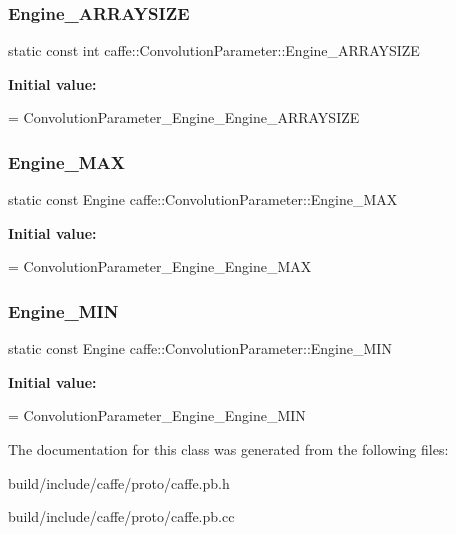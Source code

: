 \subsubsection{\texorpdfstring{Engine\+\_\+\+A\+R\+R\+A\+Y\+S\+I\+ZE}{Engine\_ARRAYSIZE}}
{\footnotesize\ttfamily static const int caffe\+::\+Convolution\+Parameter\+::\+Engine\+\_\+\+A\+R\+R\+A\+Y\+S\+I\+ZE\hspace{0.3cm}{\ttfamily [static]}}

{\bfseries Initial value\+:}
\begin{DoxyCode}
=
    ConvolutionParameter\_Engine\_Engine\_ARRAYSIZE
\end{DoxyCode}
\mbox{\label{classcaffe_1_1_convolution_parameter_a91a3593b974785391a6ae8df04d4f12b}} 
\subsubsection{\texorpdfstring{Engine\+\_\+\+M\+AX}{Engine\_MAX}}
{\footnotesize\ttfamily static const Engine caffe\+::\+Convolution\+Parameter\+::\+Engine\+\_\+\+M\+AX\hspace{0.3cm}{\ttfamily [static]}}

{\bfseries Initial value\+:}
\begin{DoxyCode}
=
    ConvolutionParameter\_Engine\_Engine\_MAX
\end{DoxyCode}
\mbox{\label{classcaffe_1_1_convolution_parameter_a89bb6e2be40de14666a1d648a4fa498e}} 
\subsubsection{\texorpdfstring{Engine\+\_\+\+M\+IN}{Engine\_MIN}}
{\footnotesize\ttfamily static const Engine caffe\+::\+Convolution\+Parameter\+::\+Engine\+\_\+\+M\+IN\hspace{0.3cm}{\ttfamily [static]}}

{\bfseries Initial value\+:}
\begin{DoxyCode}
=
    ConvolutionParameter\_Engine\_Engine\_MIN
\end{DoxyCode}


The documentation for this class was generated from the following files\+:\begin{DoxyCompactItemize}
\item 
build/include/caffe/proto/caffe.\+pb.\+h\item 
build/include/caffe/proto/caffe.\+pb.\+cc\end{DoxyCompactItemize}
